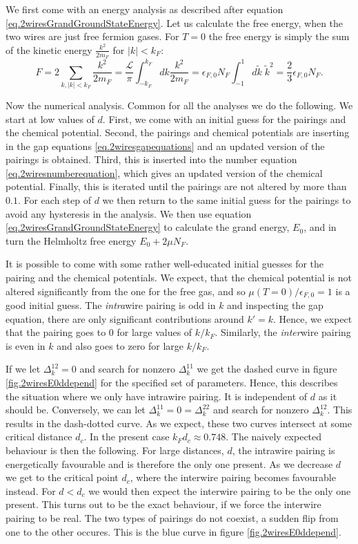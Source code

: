 We first come with an energy analysis as described after equation \eqref{eq.2wiresGrandGroundStateEnergy}. Let us calculate the free energy, when the two wires are just free fermion gases. For $T = 0$ the free energy is simply the sum of the kinetic energy $\frac{k^2}{2m_F}$ for $|k| < k_F$: 
\begin{equation}
F = 2\sum_{k, |k| < k_F} \frac{k^2}{2m_F} = \frac{\mathcal{L}}{\pi} \int^{k_F}_{-k_F} dk \frac{k^2}{2m_F} = \epsilon_{F,0} N_F \int^{1}_{-1} d\tilde{k}\; \tilde{k}^2 = \frac{2}{3}\epsilon_{F,0} N_F. 
\end{equation}

Now the numerical analysis. Common for all the analyses we do the following. We start at low values of $d$. First, we come with an initial guess for the pairings and the chemical potential. Second, the pairings and chemical potentials are inserting in the gap equations \ref{eq.2wiresgapequations} and an updated version of the pairings is obtained. Third, this is inserted into the number equation \ref{eq.2wiresnumberequation}, which gives an updated version of the chemical potential. Finally, this is iterated until the pairings are not altered by more than $0.1$\textperthousand. For each step of $d$ we then return to the same initial guess for the pairings to avoid any hysteresis in the analysis. We then use equation \eqref{eq.2wiresGrandGroundStateEnergy} to calculate the grand energy, $E_0$, and in turn the Helmholtz free energy $E_0 + 2\mu N_F$.  

It is possible to come with some rather well-educated initial guesses for the pairing and the chemical potentials. We expect, that the chemical potential is not altered significantly from the one for the free gas, and so $\mu(T = 0)/\epsilon_{F,0} = 1$ is a good initial guess. The \textit{intra}wire pairing is odd in $k$ and inspecting the gap equation, there are only significant contributions around $k' = k$. Hence, we expect that the pairing goes to 0 for large values of $k/k_F$. Similarly, the \textit{inter}wire pairing is even in $k$ and also goes to zero for large $k / k_F$. 

If we let $\Delta^{12}_k = 0$ and search for nonzero $\Delta^{11}_k$ we get the dashed curve in figure \ref{fig.2wiresE0ddepend} for the specified set of parameters. Hence, this describes the situation where we only have intrawire pairing. It is independent of $d$ as it should be. Conversely, we can let $\Delta^{11}_k = 0 = \Delta^{22}_k$ and search for nonzero $\Delta^{12}_k$. This results in the dash-dotted curve. As we expect, these two curves intersect at some critical distance $d_c$. In the present case $k_Fd_c \approx 0.748$. The naively expected behaviour is then the following. For large distances, $d$, the intrawire pairing is energetically favourable and is therefore the only one present. As we decrease $d$ we get to the critical point $d_c$, where the interwire pairing becomes favourable instead. For $d < d_c$ we would then expect the interwire pairing to be the only one present. This turns out to be the exact behaviour, if we force the interwire pairing to be real. The two types of pairings do not coexist, a sudden flip from one to the other occures. This is the blue curve in figure \ref{fig.2wiresE0ddepend}. 

